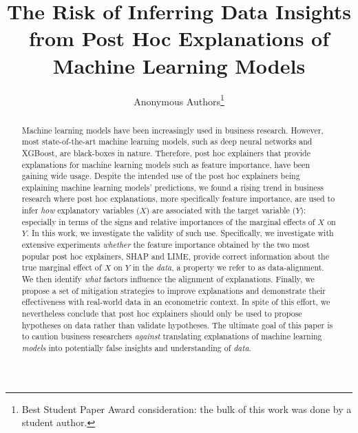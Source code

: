\documentclass[12pt]{article}  %
\date{}
\begin{document}
\title{The Risk of Inferring Data Insights from Post Hoc Explanations of Machine Learning Models}

\author{Anonymous Authors\footnote{Best Student Paper Award consideration: the bulk of this work was done by a student author.}}


\maketitle

\begin{abstract}
Machine learning models have been increasingly used in business research. However, most state-of-the-art machine learning models, such as deep neural networks and XGBoost, are black-boxes in nature. Therefore, post hoc explainers that provide explanations for machine learning models such as feature importance, have been gaining wide usage. Despite the intended use of the post hoc explainers being explaining machine learning models' predictions, we found a rising trend in business research where post hoc explanations, more specifically feature importance, are used to infer \emph{how} explanatory variables ($X$) are associated with the target variable ($Y$): especially in terms of the signs and relative importances of the marginal effects of $X$ on $Y$. In this work, we investigate the validity of such use. Specifically, we investigate with extensive experiments \emph{whether} the feature importance obtained by the two most popular post hoc explainers, SHAP and LIME, provide correct information about the true marginal effect of $X$ on $Y$ in the \textit{data}, a property we refer to as data-alignment. We then identify \emph{what} factors influence the alignment of explanations. Finally, we propose a set of mitigation strategies to improve explanations and demonstrate their effectiveness with real-world data in an econometric context. In spite of this effort, we nevertheless conclude that post hoc explainers should only be used to propose hypotheses on data rather than validate hypotheses. The ultimate goal of this paper is to caution business researchers \textit{against} translating explanations of machine learning \textit{models} into potentially false insights and understanding of \textit{data}. %
\end{abstract}
\end{document}
